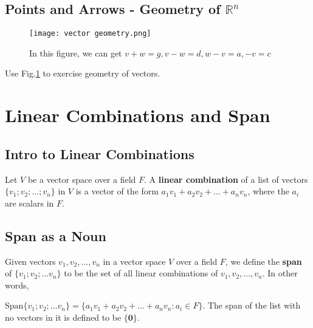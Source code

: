 \documentclass{package/notes}
\begin{document}
\subsection{Points and Arrows - Geometry of $\mathbb{R}^n$}

\begin{figure}[h]
    \centering
    \texttt{[image: vector geometry.png]}
    \caption{In this figure, we can get $v+w=g, v-w=d, w-v=a, -v=c$}
    \label{vector geometry}
\end{figure}

Use Fig.\ref{vector geometry} to exercise geometry of vectors. 

\section{Linear Combinations and Span}
\subsection{Intro to Linear Combinations}

\begin{definition}

    Let $V$ be a vector space over a field $F$. A \textbf{linear combination} of a list of vectors $\{v_1;v_2;\dots; v_n\}$ in $V$ is a vector of the form $a_1v_1+a_2v_2+\dots +a_nv_n$, where the $a_i$ are scalars in $F$.
\end{definition}

\subsection{Span as a Noun}
\begin{definition}[Span (n.)]

    Given vectors $v_1, v_2,\dots , v_n$ in a vector space $V$ over a field $F$, we define the \textbf{span} of $\{v_1;v_2;\dots v_n\}$ to be the set of all linear combinations of $v_1, v_2, \dots, v_n$. In other words,

    $\mathrm{Span}\{ v_1; v_2; \ldots v_ n\}  = \{ a_1 v_1 + a_2 v_2 + \ldots + a_ nv_ n : a_ i \in F \} .$
    The span of the list with no vectors in it is defined to be $\{\boldsymbol{0}\}$.

\end{definition}
\end{document}
